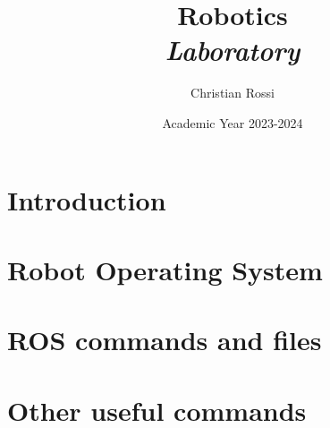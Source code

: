 \documentclass[12pt, a4paper]{report}
\title{Robotics \\ \textit{Laboratory}}
\author{Christian Rossi}
\date{Academic Year 2023-2024}
\begin{document}
    \maketitle

    

    \cleardoublepage{}

    \tableofcontents

    \cleardoublepage{}

    \chapter{Introduction}
    
    

    \chapter{Robot Operating System}
    
    
    

    \chapter{ROS commands and files}
    
     
     
     
     
     

    \appendix
    \chapter{Other useful commands}
    
\end{document}
